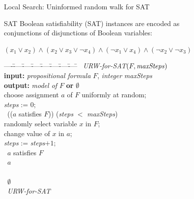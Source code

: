 \begin{frame}[c]{Local Search: Uninformed random walk for SAT}

\begin{block}{SAT}
Boolean satisfiability (SAT) instances are encoded as\\ conjunctions of disjunctions of Boolean variables:

$(x_1 \vee x_2)\wedge (x_2 \vee x_3 \vee \neg x_4) \wedge (\neg x_1 \vee x_4) \wedge (\neg x_2 \vee \neg x_3)$
\end{block}

\pause

{\footnotesize
\begin{tabbing}
----\=----\=----\=----\=----\=----\=----\=----\=\kill
\pscProc\ {\em URW-for-SAT$(F,\mbox{\emph{maxSteps}})$}\\
\> {\bf input:} {\em propositional formula} $F$, \emph{integer} \emph{maxSteps}\\
\> {\bf output:} {\em model of $F$} {\bf or} $\emptyset$\\[1mm]
\> choose assignment $a$ of $F$ uniformly at random;\\
\> \emph{steps} := 0; \\
\> \pscWhile\ \pscNot(($a$ satisfies $F$)) \pscAnd{}
         (\emph{steps} $<$ \emph{maxSteps}) \pscDo\\
\> \> randomly select variable $x$ in $F$;\\ 
\> \> change value of $x$ in $a$;\\ 
\> \> \emph{steps} := \emph{steps}$+1$;\\
\> \> \pscIf\ $a$ satisfies $F$ \pscThen \\
\> \> \> \pscReturn\ $a$\\
\> \pscEnd\\
\> \pscReturn\ $\emptyset$\\
\pscEnd\ {\em URW-for-SAT}
\end{tabbing}
}
\end{frame}

